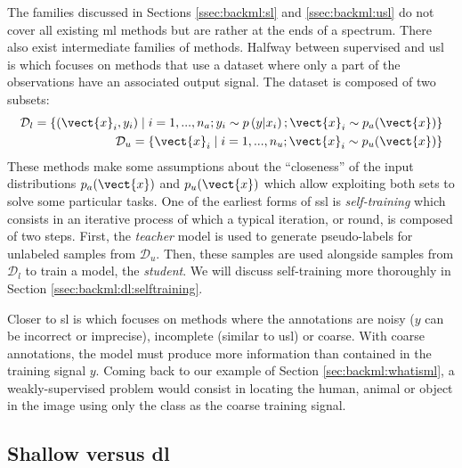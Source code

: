 The families discussed in Sections \ref{ssec:backml:sl} and \ref{ssec:backml:usl}
do not cover all existing \acrlong{ml} methods but are rather at the ends of a
spectrum. There also exist intermediate families of methods. Halfway between
supervised and \acrlong{usl} is  which focuses on methods that
use a dataset where only a part of the observations have an associated output
signal. The dataset is composed of two subsets:
\begin{eqnarray}
\mathcal{D}_l = \left\{(\vect{x}_i, y_i) \mid i = 1,...,n_a; y_i \sim p\left(y | x_i\right); \vect{x}_i \sim p_a(\vect{x})\right\} \\
\mathcal{D}_u = \left\{\vect{x}_i \mid i = 1,...,n_u; \vect{x}_i \sim p_u(\vect{x})\right\}
\end{eqnarray}
These methods make some assumptions about the ``closeness'' of the input distributions
$p_a(\vect{x})$ and $p_u(\vect{x})$ \cite{chapelle2006semi} which allow
exploiting both sets to solve some particular tasks. One of the earliest forms of
\acrlong{ssl} is \textit{self-training} \cite{scudder1965probability, yarowsky1995unsupervised} which consists in an iterative process of which a typical iteration, or round, is composed of two steps. First, the \textit{teacher} model is used to generate pseudo-labels for unlabeled samples from $\mathcal{D}_u$. Then, these samples are used alongside samples from $\mathcal{D}_l$ to train a model, the \textit{student}. We will discuss self-training more thoroughly in Section \ref{ssec:backml:dl:selftraining}.

Closer to \acrlong{sl} is  which focuses on methods where the
annotations are noisy (\eg $y$ can be incorrect or imprecise), incomplete (similar
to \acrlong{usl}) or coarse. With coarse annotations, the model must produce more
information than contained in the training signal $y$. Coming back to our example
of Section \ref{sec:backml:whatisml}, a weakly-supervised problem would consist
in locating the human, animal or object in the image using only the class as the
coarse training signal.

\subsection{Shallow versus \acrlong{dl}}
\label{ssec:backml:shallowdeep}

